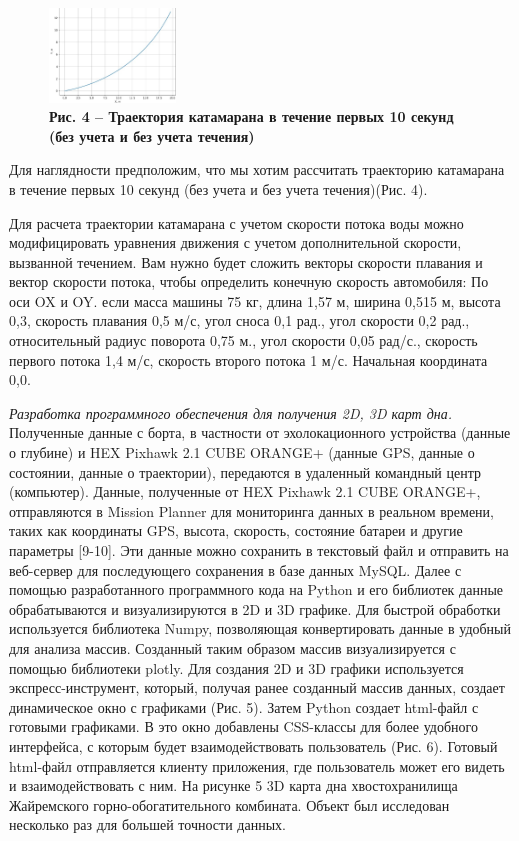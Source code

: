 \begin{figure}[H]
	\centering
	\includegraphics[width=0.3\textwidth]{assets/211}
	\caption*{\bfseries Рис. 4 -- Траектория катамарана в течение первых 10 секунд (без
  учета и без учета течения)}
\end{figure}


\begin{multicols}{2}

Для наглядности предположим, что мы хотим рассчитать траекторию
катамарана в течение первых 10 секунд (без учета и без учета течения)(Рис. 4).

Для расчета траектории катамарана с учетом скорости потока воды можно
модифицировать уравнения движения с учетом дополнительной скорости,
вызванной течением. Вам нужно будет сложить векторы скорости плавания и
вектор скорости потока, чтобы определить конечную скорость автомобиля:
По оси OX и OY. если масса машины 75 кг, длина 1,57 м, ширина 0,515 м,
высота 0,3, скорость плавания 0,5 м/с, угол сноса 0,1 рад., угол
скорости 0,2 рад., относительный радиус поворота 0,75 м., угол скорости
0,05 рад/с., скорость первого потока 1,4 м/с, скорость второго потока 1
м/с. Начальная координата 0,0.

\emph{Разработка программного обеспечения для получения 2D, 3D карт
дна.} Полученные данные с борта, в частности от эхолокационного
устройства (данные о глубине) и HEX Pixhawk 2.1 CUBE ORANGE+ (данные
GPS, данные о состоянии, данные о траектории), передаются в удаленный
командный центр (компьютер). Данные, полученные от HEX Pixhawk 2.1 CUBE
ORANGE+, отправляются в Mission Planner для мониторинга данных в
реальном времени, таких как координаты GPS, высота, скорость, состояние
батареи и другие параметры {[}9-10{]}. Эти данные можно сохранить в
текстовый файл и отправить на веб-сервер для последующего сохранения в
базе данных MySQL. Далее с помощью разработанного программного кода на
Python и его библиотек данные обрабатываются и визуализируются в 2D и 3D
графике. Для быстрой обработки используется библиотека Numpy,
позволяющая конвертировать данные в удобный для анализа массив.
Созданный таким образом массив визуализируется с помощью библиотеки
plotly. Для создания 2D и 3D графики используется экспресс-инструмент,
который, получая ранее созданный массив данных, создает динамическое
окно с графиками (Рис. 5). Затем Python создает html-файл с готовыми
графиками. В это окно добавлены CSS-классы для более удобного
интерфейса, с которым будет взаимодействовать пользователь (Рис. 6).
Готовый html-файл отправляется клиенту приложения, где пользователь
может его видеть и взаимодействовать с ним. На рисунке 5 3D карта дна
хвостохранилища Жайремского горно-обогатительного комбината. Объект был
исследован несколько раз для большей точности данных.
\end{multicols}
